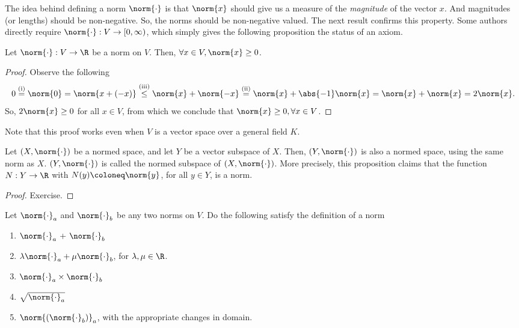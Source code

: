 \documentclass[draft]{penrose}
\begin{document}
The idea behind defining a norm $\norm{\cdot}$ is that $\norm{x}$ should give us a measure of the \emph{magnitude} of the vector $x$. And magnitudes (or lengths) should be non-negative. So, the norms should be non-negative valued. The next result confirms this property. Some authors directly require $\norm{\cdot}:V\to[0,\infty)$, which simply gives the following proposition the status of an axiom.

\begin{nprop}
  Let $\norm{\cdot}:V\to\R$ be a norm on $V$. Then, $\forall x \in V, \norm{x} \geq 0$.
\end{nprop}
\begin{proof}
  Observe the following
  \begin{equation*}
    0
    \overset{\text{(i)}}{=} \norm{0}
    = \norm{x+(-x)}
    \overset{\text{(iii)}}{\leq} \norm{x} + \norm{-x}
    \overset{\text{(ii)}}{=} \norm{x} + \abs{-1}\norm{x}
    = \norm{x} + \norm{x}
    = 2\norm{x}.
  \end{equation*}
  So, $2\norm{x} \geq 0$ for all $x \in V$, from which we conclude that $\norm{x} \geq 0, \forall x \in V$.
\end{proof}

Note that this proof works even when $V$ is a vector space over a general field $K$.

\begin{nprop}
  Let $(X, \norm{\cdot})$ be a normed space, and let $Y$ be a vector subspace of $X$. Then, $(Y, \norm{\cdot})$ is also a normed space, using the same norm as $X$. $(Y, \norm{\cdot})$ is called the normed subspace of $(X, \norm{\cdot})$. More precisely, this proposition claims that the function $N:Y \to \R$ with $N(y) \coloneq \norm{y}$, for all $y \in Y$, is a norm.
\end{nprop}
\begin{proof}
  Exercise.
\end{proof}

\begin{nex}
  Let $\norm{\cdot}_a$ and $\norm{\cdot}_b$ be any two norms on $V$. Do the following satisfy the definition of a norm
  \begin{enumerate}
  \item $\norm{\cdot}_a$ + $\norm{\cdot}_b$
  \item $\lambda\norm{\cdot}_a + \mu\norm{\cdot}_b$, for $\lambda, \mu \in \R$.
  \item $\norm{\cdot}_a \times \norm{\cdot}_b$
  \item $\sqrt{\norm{\cdot}_{a}}$
  \item $\norm{\left(\norm{\cdot}_b\right)}_{a}$, with the appropriate changes in domain.
  \end{enumerate}
\end{nex}
\end{document}
